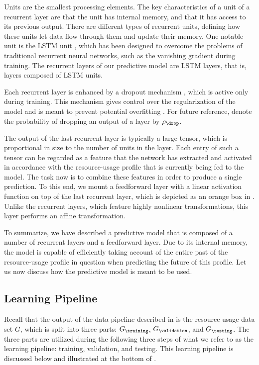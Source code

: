 Units are the smallest processing elements. The key characteristics of a unit of
a recurrent layer are that the unit has internal memory, and that it has access
to its previous output. There are different types of recurrent units, defining
how these units let data flow through them and update their memory. One notable
unit is the \ac{LSTM} unit \cite{hochreiter1997}, which has been designed to
overcome the problems of traditional recurrent neural networks, such as the
vanishing gradient during training. The recurrent layers of our predictive model
are \ac{LSTM} layers, that is, layers composed of \ac{LSTM} units.

Each recurrent layer is enhanced by a dropout mechanism \cite{zaremba2014},
which is active only during training. This mechanism gives control over the
regularization of the model and is meant to prevent potential overfitting
\cite{hastie2013}. For future reference, denote the probability of dropping an
output of a layer by $\rho_\drop$.

The output of the last recurrent layer is typically a large tensor, which is
proportional in size to the number of units in the layer. Each entry of such a
tensor can be regarded as a feature that the network has extracted and activated
in accordance with the resource-usage profile that is currently being fed to the
model. The task now is to combine these features in order to produce a single
prediction. To this end, we mount a feedforward layer with a linear activation
function on top of the last recurrent layer, which is depicted as an orange box
in . Unlike the recurrent layers, which feature
highly nonlinear transformations, this layer performs an affine transformation.

To summarize, we have described a predictive model that is composed of a number
of recurrent layers and a feedforward layer. Due to its internal memory, the
model is capable of efficiently taking account of the entire past of the
resource-usage profile in question when predicting the future of this profile.
Let us now discuss how the predictive model is meant to be used.

\subsection{Learning Pipeline}

Recall that the output of the data pipeline described in
 is the resource-usage data set $G$, which is split
into three parts: $G_\training$, $G_\validation$, and $G_\testing$. The three
parts are utilized during the following three steps of what we refer to as the
learning pipeline: training, validation, and testing. This learning pipeline is
discussed below and illustrated at the bottom of .

